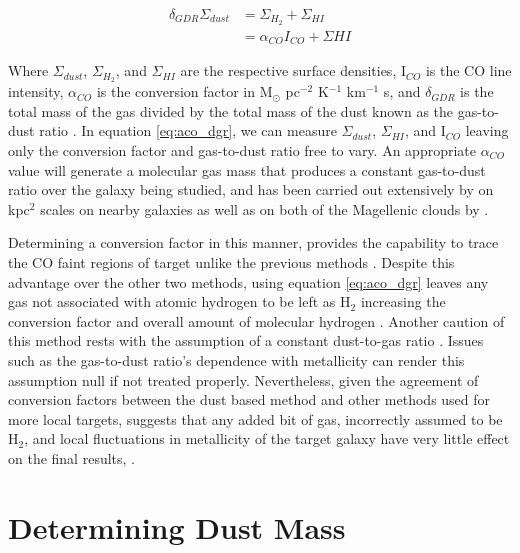 \begin{equation}\label{eq:aco_dgr}
  \begin{split}
    \delta_{GDR}\Sigma_{dust} & = \Sigma_{H_2} + \Sigma_{HI} \\
    						  & = \alpha_{CO} I_{CO} + \Sigma{HI}
  \end{split}
\end{equation}

Where $\Sigma_{dust}$, $\Sigma_{H_2}$, and $\Sigma_{HI}$ are the respective surface densities, I$_{CO}$ is the CO line intensity, $\alpha_{CO}$ is the conversion factor in M$_\odot$ pc$^{-2}$ K$^{-1}$ km$^{-1}$ s, and $\delta_{GDR}$ is the total mass of the gas divided by the total mass of the dust known as the gas-to-dust ratio \citep{leroy2011,sandstrom2013}.  In equation \ref{eq:aco_dgr}, we can measure $\Sigma_{dust}$, $\Sigma_{HI}$, and I$_{CO}$ leaving only the conversion factor and gas-to-dust ratio free to vary.  An appropriate $\alpha_{CO}$ value will generate a molecular gas mass that produces a constant gas-to-dust ratio over the galaxy being studied, and has been carried out extensively by \cite{sandstrom2013} on kpc$^2$ scales on nearby galaxies as well as on both of the Magellenic clouds by \cite{leroy2011}.

Determining a conversion factor in this manner, provides the capability to trace the CO faint regions of target unlike the previous methods \citep{israel1997}.  Despite this advantage over the other two methods, using equation \ref{eq:aco_dgr} leaves any gas not associated with atomic hydrogen to be left as H$_2$ increasing the conversion factor and overall amount of molecular hydrogen \citep{bolatto2013}.  Another caution of this method rests with the assumption of a constant dust-to-gas ratio \citep{bolatto2013}.  Issues such as the gas-to-dust ratio's dependence with metallicity \citep{draine2007} can render this assumption null if not treated properly.  Nevertheless, given the agreement of conversion factors between the dust based method and other methods used for more local targets, suggests that any added bit of gas, incorrectly assumed to be H$_2$, and local fluctuations in metallicity of the target galaxy have very little effect on the final results, \citep{bolatto2013}.

\section{Determining Dust Mass}

